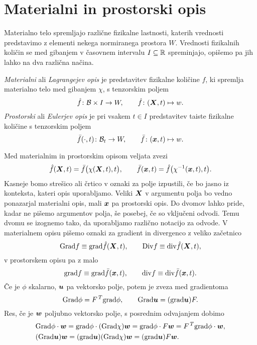 \section{Materialni in prostorski opis}


Materialno telo spremljajo različne fizikalne lastnosti, katerih vrednosti predstavimo z elementi nekega
normiranega prostora $W$. Vrednosti fizikalnih količin
se med gibanjem v časovnem intervalu $I\subseteq\mathbb R$ spreminjajo, opišemo pa jih lahko na
dva različna načina.
\begin{definicija}
	\emph{Materialni} ali \emph{Lagrangejev opis} je predstavitev fizikalne količine $f$, ki spremlja materialno telo
	med gibanjem $\chi$, s tenzorskim poljem
	\[ \hat{f}\colon\mathcal B\times I \to W, \qquad \hat{f}\colon (\boldsymbol X,t)\mapsto w. \]
	\emph{Prostorski} ali \emph{Eulerjev opis} je pri vsakem $t\in I$ predstavitev taiste fizikalne količine s tenzorskim poljem
	\[ \bar{f}(\cdot,t)\colon\mathcal B_t\to W, \qquad \bar{f}\colon (\boldsymbol x,t)\mapsto w. \]
\end{definicija}
Med materialnim in prostorskim opisom veljata zvezi
\begin{equation}\label{e:mpo-zveza}
	\hat{f}(\boldsymbol X,t) = \bar{f}\big(\chi(\boldsymbol X,t),t\big),\qquad \bar{f}(\boldsymbol x,t) = \hat{f}\big(\chi^{-1}(\boldsymbol x,t),t\big).
\end{equation}
Kasneje bomo strešico ali črtico v oznaki za polje izpustili, če bo jasno iz konteksta, kateri opis uporabljamo.
Veliki $\boldsymbol X$ v argumentu polja bo vedno ponazarjal materialni opis, mali $\boldsymbol x$ pa prostorski opis.
Do dvomov lahko pride, kadar ne pišemo argumentov polja, še posebej, če so vključeni odvodi. Temu dvomu se izognemo tako,
da uporabljamo različno notacijo za odvode. V materialnem opisu pišemo oznaki za gradient in divergenco z
veliko začetnico
\[ \mathrm{Grad} f\equiv\mathrm{grad} \hat{f}(\boldsymbol X,t),\qquad \mathrm {Div} f \equiv \mathrm{div} \hat{f}(\boldsymbol X,t), \]
v prostorskem opisu pa z malo
\[ \mathrm{grad} f\equiv\mathrm{grad} \bar{f}(\boldsymbol x,t),\qquad \mathrm{div} f \equiv \mathrm{div} \bar{f}(\boldsymbol x,t). \]
Če je $\phi$ skalarno, $\boldsymbol u$ pa vektorsko polje, potem je zveza med gradientoma
\begin{equation}\label{e:gz}
	\mathrm{Grad}\phi=F^{\,T}\mathrm{grad}\phi,\qquad \mathrm{Grad}\boldsymbol u=(\mathrm{grad}\boldsymbol u)F.
\end{equation}
Res, če je $\boldsymbol w$ poljubno vektorsko polje, s posrednim odvajanjem dobimo
\begin{align*}
	&\mathrm{Grad}\phi\cdot\boldsymbol w=\mathrm{grad}\phi\cdot(\mathrm{Grad}\chi)\boldsymbol w=
	\mathrm{grad}\phi\cdot F\boldsymbol w=F^{\,T}\mathrm{grad}\phi\cdot\boldsymbol w, \\
	&(\mathrm{Grad}\boldsymbol u)\boldsymbol w=(\mathrm{grad}\boldsymbol u)(\mathrm{Grad}\chi)\boldsymbol w
	=(\mathrm{grad}\boldsymbol u)F\boldsymbol w.
\end{align*}

